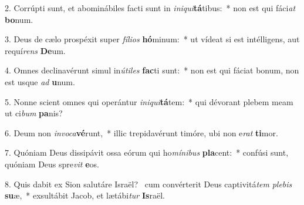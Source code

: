 2. Corrúpti sunt, et abominábiles facti sunt in \textit{in}\textit{i}\textit{qui}\textbf{tá}tibus:~*  non est qui fáci\textit{at} \textbf{bo}num.\

3. Deus de cælo prospéxit super \textit{fí}\textit{li}\textit{os} \textbf{hó}minum:~*  ut vídeat si est intélligens, aut requí\textit{rens} \textbf{De}um.\

4. Omnes declinavérunt simul in\textit{ú}\textit{ti}\textit{les} \textbf{fac}ti sunt:~*  non est qui fáciat bonum, non est usque \textit{ad} \textbf{u}num.\

5. Nonne scient omnes qui operántur \textit{in}\textit{i}\textit{qui}\textbf{tá}tem:~*  qui dévorant plebem meam ut ci\textit{bum} \textbf{pa}nis?\

6. Deum non \textit{in}\textit{vo}\textit{ca}\textbf{vé}runt,~*  illic trepidavérunt timóre, ubi non e\textit{rat} \textbf{ti}mor.\

7. Quóniam Deus dissipávit ossa eórum qui ho\textit{mí}\textit{ni}\textit{bus} \textbf{pla}cent:~*  confúsi sunt, quóniam Deus spre\textit{vit} \textbf{e}os.\

8. Quis dabit ex Sion salutáre Israël? \dag\  cum convérterit Deus captivitá\textit{tem} \textit{ple}\textit{bis} \textbf{su}æ,~*  exsultábit Jacob, et lætábi\textit{tur} \textbf{Is}raël.\

